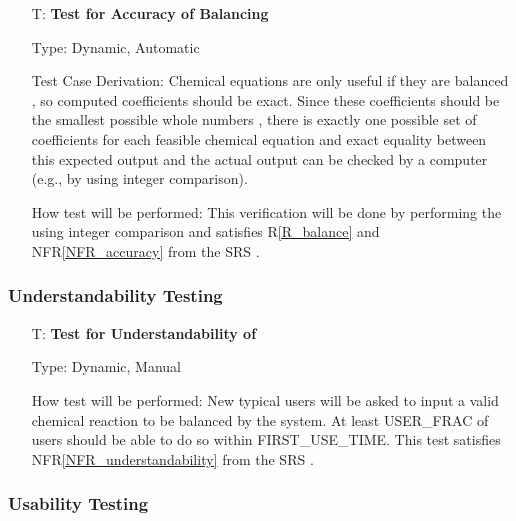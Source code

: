 \documentclass[12pt, titlepage]{article}
\newcounter{testnum} %
\newcommand{\rref}[1]{R\ref{#1}}
\newcommand{\nfrref}[1]{NFR\ref{#1}}
\begin{document}
\begin{enumerate}

  \item[T\refstepcounter{testnum}\thetestnum \label{test_bal_accuracy}:]
    \textbf{Test for Accuracy of Balancing}

    Type: Dynamic, Automatic

    Test Case Derivation: Chemical equations are only useful if they are
    balanced \cite{lund_introduction_2023}, so computed coefficients should be
    exact. Since these coefficients should be the smallest possible whole
    numbers \cite{lund_introduction_2023}, there is exactly one possible set of
    coefficients for each feasible chemical equation and exact equality between
    this expected output and the actual output can be checked by a computer
    (e.g., by using integer comparison).

    How test will be performed: This verification will be done by performing
    the  using integer comparison and satisfies
    \rref{R_balance} and \nfrref{NFR_accuracy} from the SRS \cite{srs}.

\end{enumerate}

\subsubsection{Understandability Testing}

\begin{enumerate}

  \item[T\refstepcounter{testnum}\thetestnum \label{test_understand}:]
    \textbf{Test for Understandability of \progname{}}

    Type: Dynamic, Manual

    How test will be performed: New typical users will be asked to input a
    valid chemical reaction to be balanced by the system. At least
    USER\_FRAC of users should be able to do so within
    FIRST\_USE\_TIME. This test satisfies \nfrref{NFR_understandability} from
    the SRS \cite{srs}.

\end{enumerate}

\subsubsection{Usability Testing}
\end{document}
